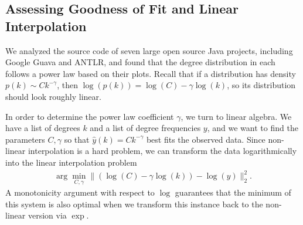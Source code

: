 \documentclass[11pt,a4paper,twocolumn]{article}
\begin{document}
\begin{singlespace}
\subsection{Assessing Goodness of Fit and Linear Interpolation}

We analyzed the source code of seven large open source Java projects, including
Google Guava and ANTLR, and found that the degree distribution in each follows
a power law based on their  plots. Recall that if a distribution has
density $p(k)\sim Ck^{-\gamma}$, then $\log(p(k))=\log(C)-\gamma\log(k)$, so
its distribution should look roughly linear.

In order to determine the power law coefficient $\gamma$, we turn to linear
algebra. We have a list of degrees $k$ and a list of degree frequencies $y$,
and we want to find the parameters $C,\gamma$ so that $\hat{y}(k)=Ck^{-\gamma}$
best fits the observed data. Since non-linear interpolation is a hard problem,
we can transform the data logarithmically into the linear interpolation
problem
\begin{align}
\label{eq:linint}
\arg\min_{C,\gamma} \|(\log(C)-\gamma\log(k))-\log(y)\|_2^2.
\end{align}
A monotonicity argument with respect to $\log$ guarantees that the minimum
of this system is also optimal when we transform this instance back to the
non-linear version via $\exp$.


\end{singlespace}
\end{document}
